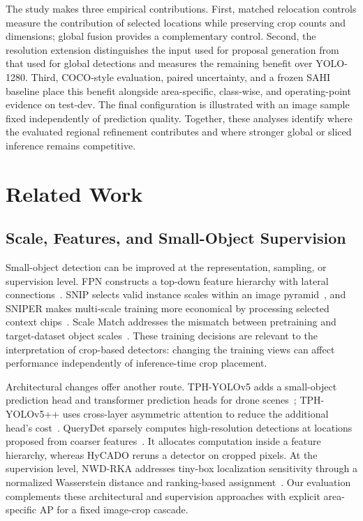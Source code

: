 \documentclass[journal]{IEEEtran}
\begin{document}
The study makes three empirical contributions. First, matched relocation controls measure the contribution of selected locations while preserving crop counts and dimensions; global fusion provides a complementary control. Second, the resolution extension distinguishes the input used for proposal generation from that used for global detections and measures the remaining benefit over YOLO-1280. Third, COCO-style evaluation, paired uncertainty, and a frozen SAHI baseline place this benefit alongside area-specific, class-wise, and operating-point evidence on test-dev. The final configuration is illustrated with an image sample fixed independently of prediction quality. Together, these analyses identify where the evaluated regional refinement contributes and where stronger global or sliced inference remains competitive.

\section{Related Work}
\subsection{Scale, Features, and Small-Object Supervision}
Small-object detection can be improved at the representation, sampling, or supervision level. FPN constructs a top-down feature hierarchy with lateral connections~\cite{lin2017fpn}. SNIP selects valid instance scales within an image pyramid~\cite{singh2018snip}, and SNIPER makes multi-scale training more economical by processing selected context chips~\cite{singh2018sniper}. Scale Match addresses the mismatch between pretraining and target-dataset object scales~\cite{yu2020tinyperson}. These training decisions are relevant to the interpretation of crop-based detectors: changing the training views can affect performance independently of inference-time crop placement.

Architectural changes offer another route. TPH-YOLOv5 adds a small-object prediction head and transformer prediction heads for drone scenes~\cite{zhu2021tph}; TPH-YOLOv5++ uses cross-layer asymmetric attention to reduce the additional head's cost~\cite{zhao2023tphplus}. QueryDet sparsely computes high-resolution detections at locations proposed from coarser features~\cite{yang2022querydet}. It allocates computation inside a feature hierarchy, whereas HyCADO reruns a detector on cropped pixels. At the supervision level, NWD-RKA addresses tiny-box localization sensitivity through a normalized Wasserstein distance and ranking-based assignment~\cite{xu2022nwd}. Our evaluation complements these architectural and supervision approaches with explicit area-specific AP for a fixed image-crop cascade.
\end{document}
